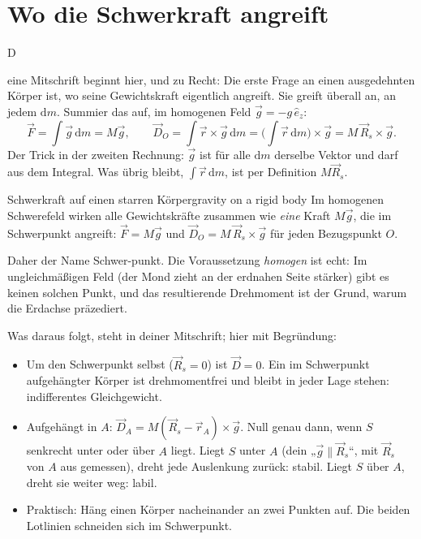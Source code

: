 \documentclass[deutsch]{kaelearn}
\newcommand\dd{\mathrm{d}}
\begin{document}
\section{Wo die Schwerkraft angreift}

\opening{D}{eine Mitschrift} beginnt hier, und zu Recht: Die erste Frage an einen ausgedehnten Körper ist, wo seine Gewichtskraft
eigentlich angreift. Sie greift überall an, an jedem $\dd m$. Summier das auf, im homogenen Feld $\vec g = -g\,\hat e_z$:
\[
  \vec F = \int\vec g\,\dd m = M\vec g,\qquad
  \vec D_O = \int\vec r\times\vec g\,\dd m = \Big(\int\vec r\,\dd m\Big)\times\vec g = M\,\vec R_s\times\vec g .
\]
Der Trick in der zweiten Rechnung: $\vec g$ ist für alle $\dd m$ derselbe Vektor und darf aus dem Integral. Was übrig bleibt,
$\int\vec r\,\dd m$, ist per Definition $M\vec R_s$.

\begin{theorem}{Schwerkraft auf einen starren Körper}{gravity on a rigid body}
Im homogenen Schwerefeld wirken alle Gewichtskräfte zusammen wie \emph{eine} Kraft $M\vec g$, die im Schwerpunkt angreift:
$\vec F = M\vec g$ und $\vec D_O = M\,\vec R_s\times\vec g$ für jeden Bezugspunkt $O$.
\end{theorem}

Daher der Name Schwer-punkt. Die Voraussetzung \emph{homogen} ist echt: Im ungleichmäßigen Feld (der Mond zieht an der erdnahen Seite
stärker) gibt es keinen solchen Punkt, und das resultierende Drehmoment ist der Grund, warum die Erdachse präzediert.

Was daraus folgt, steht in deiner Mitschrift; hier mit Begründung:
\begin{itemize}
  \item Um den Schwerpunkt selbst ($\vec R_s = 0$) ist $\vec D = 0$. Ein im Schwerpunkt aufgehängter Körper ist drehmomentfrei und
        bleibt in jeder Lage stehen: indifferentes Gleichgewicht.
  \item Aufgehängt in $A$: $\vec D_A = M(\vec R_s-\vec r_A)\times\vec g$. Null genau dann, wenn $S$ senkrecht unter oder über $A$ liegt.
        Liegt $S$ unter $A$ (dein „$\vec g\parallel\vec R_s$“, mit $\vec R_s$ von $A$ aus gemessen), dreht jede Auslenkung zurück: stabil.
        Liegt $S$ über $A$, dreht sie weiter weg: labil.
  \item Praktisch: Häng einen Körper nacheinander an zwei Punkten auf. Die beiden Lotlinien schneiden sich im Schwerpunkt.
\end{itemize}
\end{document}
